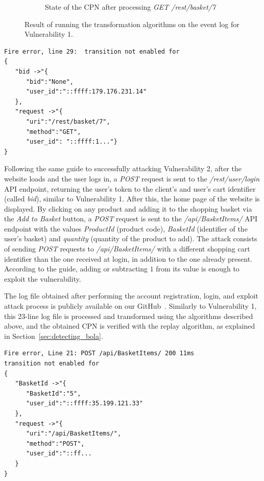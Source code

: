 \begin{figure}
\begin{subfigure}[b]{0.3\textwidth}
        \caption{State of the CPN after processing \textit{GET /rest/basket/7}}
        \label{fig:Juice_Shop_output_challenge1_c}
    \end{subfigure}
    \caption{Result of running the transformation algorithms on the event log for {\sc Vulnerability 1}.}
    \label{fig:Juice_Shop_output_challenge1}
\end{figure}

\begin{lstlisting}[caption={Error message received when executing challenge 1},captionpos=t,basicstyle=\ttfamily\small, label={lst:challenge1_error_msg},frame=single,breaklines=true]
Fire error, line 29:  transition not enabled for 
{
   "bid ->"{
      "bid":"None",
      "user_id":"::ffff:179.176.231.14"
   },
   "request ->"{
      "uri":"/rest/basket/7",
      "method":"GET",
      "user_id": "::ffff:1..."}
}
\end{lstlisting}


Following the same guide to successfully attacking {\sc Vulnerability 2}, after the website loads and the user logs in, a \textit{POST} request is sent to the \textit{/rest/user/login} API endpoint, returning the user's token to the client's and user's cart identifier (called \textit{bid}), similar to {\sc Vulnerability 1}. After this, the home page of the website is displayed. By clicking on any product and adding it to the shopping basket via the \textit{Add to Basket} button, a \textit{POST} request is sent to the  \textit{/api/BasketItems/} API endpoint with the values \textit{ProductId} (product code), \textit{BasketId} (identifier of the user's basket) and \textit{quantity} (quantity of the product to add). The attack consists of sending \textit{POST} requests to \textit{/api/BasketItems/} with a different shopping cart identifier than the one received at login, in addition to the one already present. According to the guide, adding or subtracting $1$ from its value is enough to exploit the vulnerability.

The log file obtained after performing the account registration, login, and exploit attack process is publicly available on our GitHub~\cite{links2cpn}. Similarly to {\sc Vulnerability 1}, this 23-line log file is processed and transformed using the algorithms described above, and the obtained CPN is verified with the replay algorithm, as explained in Section~\ref{sec:detecting_bola}. 

\begin{lstlisting}[caption={Error message received when executing challenge 2}, captionpos=t,basicstyle=\ttfamily\small, label={lst:challenge2_error_msg},frame=single,breaklines=true]
Fire error, Line 21: POST /api/BasketItems/ 200 11ms
transition not enabled for
{
   "BasketId ->"{
      "BasketId":"5",
      "user_id":"::ffff:35.199.121.33"
   },
   "request ->"{
      "uri":"/api/BasketItems/",
      "method":"POST",
      "user_id":"::ff...
   }
}
\end{lstlisting}


